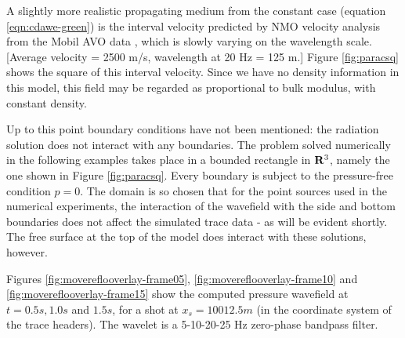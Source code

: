 A slightly more realistic propagating medium from the constant case (equation \ref{eqn:cdawe-green})  is  the  interval velocity predicted by NMO velocity analysis from the Mobil AVO data \cite[]{basic-caam641:17}, which is slowly varying on the wavelength scale. [Average velocity = 2500 m/s, wavelength at 20 Hz = 125 m.] Figure \ref{fig:paracsq} shows the square of this interval velocity. Since we have no density information in this model, this field may be regarded as proportional to bulk modulus, with constant density.

Up to this point boundary conditions have not been mentioned: the radiation solution does not interact with any boundaries. The problem solved numerically in the following examples takes place in a bounded rectangle in ${\bf R}^3$, namely the one shown in Figure \ref{fig:paracsq}. Every boundary is subject to the pressure-free condition $p=0$. The domain is so chosen that for the point sources used in the numerical experiments, the interaction of the wavefield with the side and bottom boundaries does not affect the simulated trace data - as will be evident shortly. The free surface at the top of the model does interact with these solutions, however.


Figures \ref{fig:movereflooverlay-frame05}, \ref{fig:movereflooverlay-frame10} and \ref{fig:movereflooverlay-frame15} show the computed pressure wavefield at $t=0.5s, 1.0s$ and $1.5s$, for a shot at $x_s=10012.5 m$ (in the coordinate system of the trace headers).
The wavelet is a 5-10-20-25 Hz zero-phase bandpass filter.




